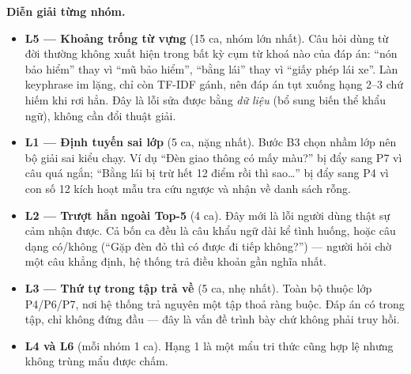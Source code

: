 \textbf{Diễn giải từng nhóm.}
\begin{itemize}
  \item \textbf{L5 --- Khoảng trống từ vựng} (15 ca, nhóm lớn nhất). Câu hỏi dùng từ đời thường
        không xuất hiện trong bất kỳ cụm từ khoá nào của đáp án: ``nón bảo hiểm'' thay vì ``mũ
        bảo hiểm'', ``bằng lái'' thay vì ``giấy phép lái xe''. Làn keyphrase im lặng, chỉ còn
        TF-IDF gánh, nên đáp án tụt xuống hạng 2--3 chứ hiếm khi rơi hẳn. Đây là lỗi sửa được
        bằng \emph{dữ liệu} (bổ sung biến thể khẩu ngữ), không cần đổi thuật giải.
  \item \textbf{L1 --- Định tuyến sai lớp} (5 ca, nặng nhất). Bước B3 chọn nhầm lớp nên bộ giải
        sai kiểu chạy. Ví dụ ``Đèn giao thông có mấy màu?'' bị đẩy sang P7 vì câu quá ngắn;
        ``Bằng lái bị trừ hết 12 điểm rồi thì sao\dots'' bị đẩy sang P4 vì con số 12 kích hoạt
        mẫu tra cứu ngược và nhận về danh sách rỗng.
  \item \textbf{L2 --- Trượt hẳn ngoài Top-5} (4 ca). Đây mới là lỗi người dùng thật sự cảm nhận
        được. Cả bốn ca đều là câu khẩu ngữ dài kể tình huống, hoặc câu dạng có/không (``Gặp đèn
        đỏ thì có được đi tiếp không?'') --- người hỏi chờ một câu khẳng định, hệ thống trả điều
        khoản gần nghĩa nhất.
  \item \textbf{L3 --- Thứ tự trong tập trả về} (5 ca, nhẹ nhất). Toàn bộ thuộc lớp P4/P6/P7,
        nơi hệ thống trả nguyên một tập thoả ràng buộc. Đáp án có trong tập, chỉ không đứng đầu
        --- đây là vấn đề trình bày chứ không phải truy hồi.
  \item \textbf{L4 và L6} (mỗi nhóm 1 ca). Hạng 1 là một mẩu tri thức cũng hợp lệ nhưng không
        trùng mẩu được chấm.
\end{itemize}

